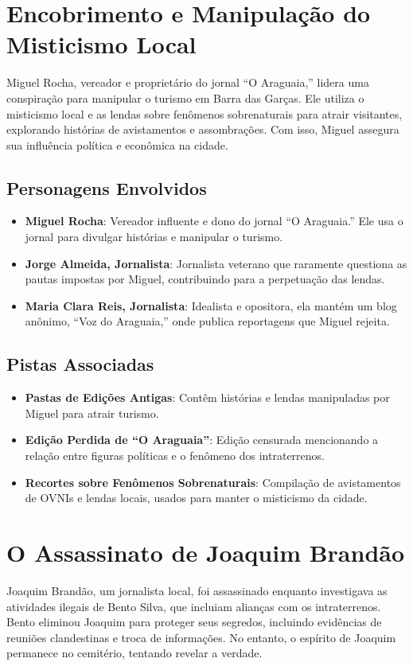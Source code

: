 \section{Encobrimento e Manipulação do Misticismo Local}
Miguel Rocha, vereador e proprietário do jornal “O Araguaia,” lidera uma conspiração para manipular o turismo em Barra das Garças. Ele utiliza o misticismo local e as lendas sobre fenômenos sobrenaturais para atrair visitantes, explorando histórias de avistamentos e assombrações. Com isso, Miguel assegura sua influência política e econômica na cidade.

\subsection{Personagens Envolvidos}
\begin{itemize}
    \item \textbf{Miguel Rocha}: Vereador influente e dono do jornal “O Araguaia.” Ele usa o jornal para divulgar histórias e manipular o turismo.
    \item \textbf{Jorge Almeida, Jornalista}: Jornalista veterano que raramente questiona as pautas impostas por Miguel, contribuindo para a perpetuação das lendas.
    \item \textbf{Maria Clara Reis, Jornalista}: Idealista e opositora, ela mantém um blog anônimo, “Voz do Araguaia,” onde publica reportagens que Miguel rejeita.
\end{itemize}

\subsection{Pistas Associadas}
\begin{itemize}
    \item \textbf{Pastas de Edições Antigas}: Contêm histórias e lendas manipuladas por Miguel para atrair turismo.
    \item \textbf{Edição Perdida de “O Araguaia”}: Edição censurada mencionando a relação entre figuras políticas e o fenômeno dos intraterrenos.
    \item \textbf{Recortes sobre Fenômenos Sobrenaturais}: Compilação de avistamentos de OVNIs e lendas locais, usados para manter o misticismo da cidade.
\end{itemize}

\section{O Assassinato de Joaquim Brandão}
Joaquim Brandão, um jornalista local, foi assassinado enquanto investigava as atividades ilegais de Bento Silva, que incluiam alianças com os intraterrenos. Bento eliminou Joaquim para proteger seus segredos, incluindo evidências de reuniões clandestinas e troca de informações. No entanto, o espírito de Joaquim permanece no cemitério, tentando revelar a verdade.

